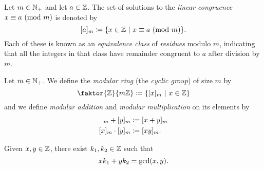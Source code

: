 \begin{definition}
    Let $m \in \mathbb{N}_+$ and let $a \in \mathbb{Z}$.
    The set of solutions to the \emph{linear congruence} $\modulo{x}{a}{m}$ is denoted by
    \[
        [a]_m \defn \set*{x \in \Z \suchthat \modulo{x}{a}{m}}.
    \]
    Each of these is known as an \emph{equivalence class} of \emph{residues} modulo $m$,
    indicating that all the integers in that class have remainder congruent to $a$
    after division by $m$.
\end{definition}

\begin{definition}
    Let $m \in \mathbb{N}_+$.
    We define the \emph{modular ring}
    (\aka the \emph{cyclic group}) of size $m$ by
    \begin{equation*}
        \faktor{\Z}{m\Z} \defn \set*{[x]_m \suchthat x \in \Z}
    \end{equation*}
    and we define \emph{modular addition}
    and \emph{modular multiplication}
    on its elements by
    \begin{align*}
        [x]_m + [y]_m &\defn [x + y]_m \\
        [x]_m \cdot [y]_m &\defn [xy]_m.
    \end{align*}
\end{definition}

\begin{theorem}
    Given $x, y \in \mathbb{Z}$, there exist $k_1, k_2 \in \mathbb{Z}$ such that
    \begin{equation*}
        xk_1 + yk_2 = \gcd\pn*{x, y}.
    \end{equation*}
\end{theorem}


